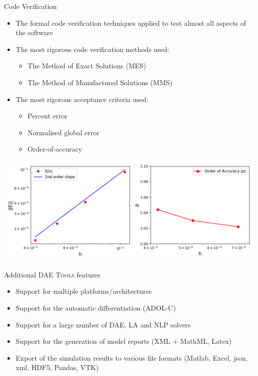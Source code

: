 \documentclass[compress,newPxFont,sthlmFooter]{beamer}
\begin{document}
\begin{frame}[plain]{Code Verification}
  \begin{itemize}
      \item The \alert{formal code verification techniques} applied to test almost all aspects of the software
      \item The \alert{most rigorous code verification methods} used:
        \begin{itemize}
          \item The \alert{Method of Exact Solutions} (MES) 
          \item The \alert{Method of Manufactured Solutions} (MMS)
        \end{itemize}
      \item The \alert{most rigorous acceptance criteria} used:
        \begin{itemize}
          \item Percent error
          \item Normalised global error
          \item \alert{Order-of-accuracy}
        \end{itemize}
  \end{itemize}
  \begin{center}
      \includegraphics[align=c, height=0.35\paperheight]{code_verification.png}
  \end{center}
\end{frame}

\begin{frame}{Additional \textsc{DAE Tools} features}
    \begin{itemize}
        \item Support for \alert{multiple platforms/architectures} 
        \item Support for the \alert{automatic differentiation} (ADOL-C)
        \item Support for a large number of \alert{DAE}, \alert{LA} and \alert{NLP} solvers 
        \item Support for the generation of \alert{model reports} (XML + MathML, Latex)
        \item \alert{Export} of the \alert{simulation results} to various file formats (Matlab, Excel, json, xml, HDF5, Pandas, VTK)
    \end{itemize}
\end{frame}
\end{document}
